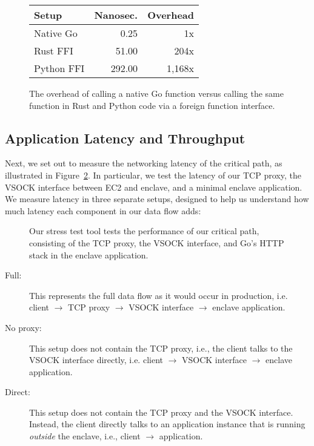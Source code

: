 \begin{figure}[t]
    \centering
    \begin{tabular}{l r r}
    \toprule
      Setup & Nanosec. & Overhead \\
    \midrule
      Native Go & 0.25 & 1x \\
      Rust FFI & 51.00 & 204x \\
      Python FFI & 292.00 & 1,168x \\
    \bottomrule
    \end{tabular}
    \caption{The overhead of calling a native Go function versus calling the
    same function in Rust and Python code via a foreign function interface.}
    \label{fig:ffi-overhead}
\end{figure}

\subsection{Application Latency and Throughput}
\label{sec:end-to-end}

Next, we set out to measure the networking latency of the critical path, as
illustrated in Figure~\ref{fig:stress-test}.  In particular, we test the
latency of our TCP proxy, the VSOCK interface between EC2 and enclave, and a
minimal enclave application.
%
We measure latency in three separate setups, designed to help us understand how
much latency each component in our data flow adds:

\begin{figure}[t]
    \centering
    
    \caption{Our stress test tool tests the performance of our critical path,
    consisting of the TCP proxy, the VSOCK interface, and Go's HTTP stack in
    the enclave application.}
    \label{fig:stress-test}
\end{figure}

\begin{description}
  \item[Full:] This represents the full data flow as it would occur in
    production, i.e. client $\rightarrow$ TCP proxy $\rightarrow$ VSOCK
    interface $\rightarrow$ enclave application.

  \item[No proxy:] This setup does not contain the TCP proxy, i.e., the client
    talks to the VSOCK interface directly, i.e. client $\rightarrow$ VSOCK
    interface $\rightarrow$ enclave application.

  \item[Direct:] This setup does not contain the TCP proxy and the VSOCK
    interface.  Instead, the client directly talks to an application instance that is
    running \emph{outside} the enclave, i.e., client $\rightarrow$ application.
\end{description}

